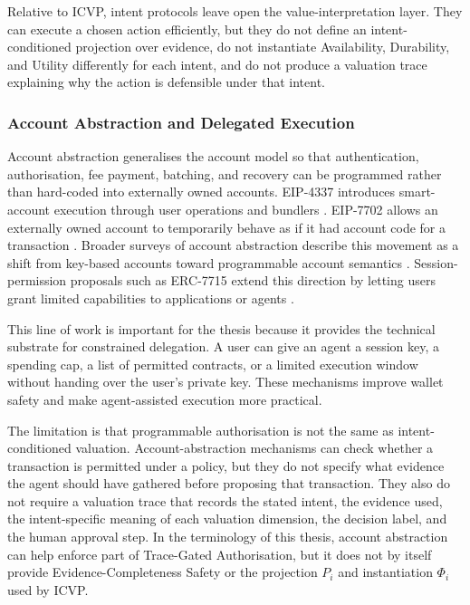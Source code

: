 Relative to ICVP, intent protocols leave open the value-interpretation layer.
They can execute a chosen action efficiently, but they do not define an
intent-conditioned projection over evidence, do not instantiate Availability,
Durability, and Utility differently for each intent, and do not produce a
valuation trace explaining why the action is defensible under that intent.

\subsubsection{Account Abstraction and Delegated Execution}

Account abstraction generalises the account model so that authentication,
authorisation, fee payment, batching, and recovery can be programmed rather than
hard-coded into externally owned accounts. EIP-4337 introduces smart-account
execution through user operations and bundlers \cite{Buterin2021}. EIP-7702
allows an externally owned account to temporarily behave as if it had account
code for a transaction \cite{EIP7702}. Broader surveys of account abstraction
describe this movement as a shift from key-based accounts toward programmable
account semantics \cite{Wang2023, Duan2024}. Session-permission proposals such
as ERC-7715 extend this direction by letting users grant limited capabilities to
applications or agents \cite{ERC7715}.

This line of work is important for the thesis because it provides the technical
substrate for constrained delegation. A user can give an agent a session key, a
spending cap, a list of permitted contracts, or a limited execution window
without handing over the user's private key. These mechanisms improve wallet
safety and make agent-assisted execution more practical.

The limitation is that programmable authorisation is not the same as
intent-conditioned valuation. Account-abstraction mechanisms can check whether a
transaction is permitted under a policy, but they do not specify what evidence
the agent should have gathered before proposing that transaction. They also do
not require a valuation trace that records the stated intent, the evidence used,
the intent-specific meaning of each valuation dimension, the decision label, and
the human approval step. In the terminology of this thesis, account abstraction
can help enforce part of Trace-Gated Authorisation, but it does not by itself
provide Evidence-Completeness Safety or the projection $P_i$ and instantiation
$\Phi_i$ used by ICVP.

